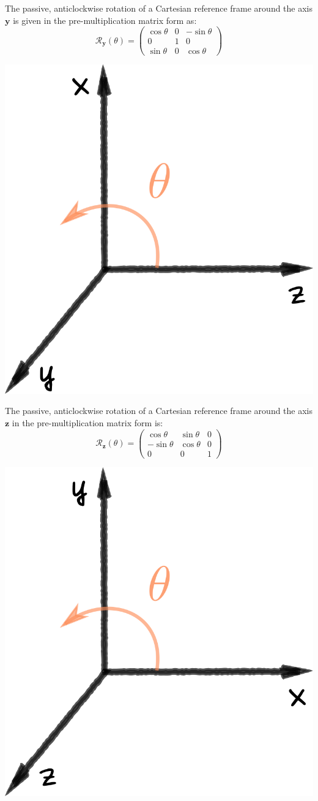 \noindent\begin{minipage}{0.47\textwidth}
The passive, anticlockwise rotation of a Cartesian reference frame around the axis $\mathbf{y}$ is given in the pre-multiplication matrix form as: 
\begin{equation*}
\mathcal{R}_\mathbf{y}(\theta)=\begin{pmatrix}
\cos{\theta}  &  0     & -\sin{\theta} \\
0             & 1      & 0 \\
\sin{\theta} & 0      & \cos{\theta}
\end{pmatrix}
\end{equation*}
\end{minipage}
\begin{minipage}{0.5\textwidth}
\centering
\includegraphics[width=0.45\linewidth]{Figures/Ry.png}
\end{minipage}



\noindent\begin{minipage}{0.47\textwidth}
The passive, anticlockwise rotation of a Cartesian reference frame around the axis $\mathbf{z}$ in the pre-multiplication matrix form is: 
\begin{equation*}
\mathcal{R}_\mathbf{z}(\theta)=\begin{pmatrix}
\cos{\theta} & \sin{\theta} & 0 \\
-\sin{\theta} & \cos{\theta}  & 0 \\
0            &  0            & 1
\end{pmatrix}
\end{equation*}
\end{minipage}%
\begin{minipage}{0.5\textwidth}
\centering
\includegraphics[width=0.45\linewidth]{Figures/Rz.png}
\end{minipage}

